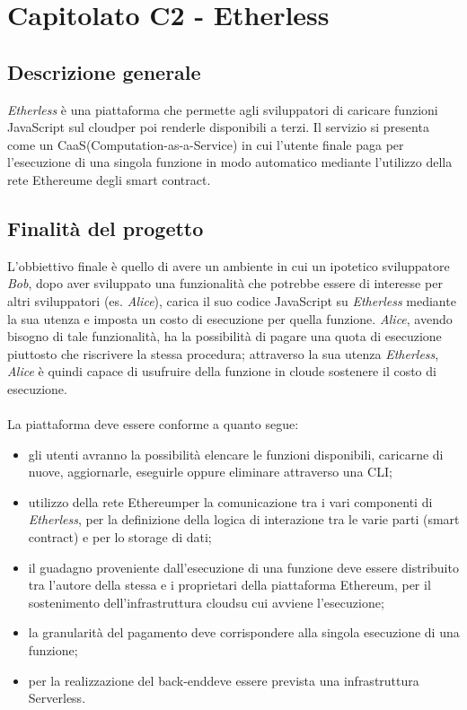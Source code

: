 \section{Capitolato C2 - Etherless}

\subsection{Descrizione generale}
\textit{Etherless} è una piattaforma che permette agli sviluppatori di caricare funzioni JavaScript sul cloud\glo per poi renderle disponibili a terzi. Il servizio si presenta come un CaaS\glo (Computation-as-a-Service) in cui l'utente finale paga per l'esecuzione di una singola funzione in modo automatico mediante l'utilizzo della rete Ethereum\glo e degli smart contract\glos. 
\subsection{Finalità del progetto}
L'obbiettivo finale è quello di avere un ambiente in cui un ipotetico sviluppatore \textit{Bob}, dopo aver sviluppato una funzionalità che potrebbe essere di interesse per altri sviluppatori (es. \textit{Alice}), carica il suo codice JavaScript su \textit{Etherless} mediante la sua utenza e imposta un costo di esecuzione per quella funzione. \textit{Alice}, avendo bisogno di tale funzionalità, ha la possibilità di pagare una quota di esecuzione piuttosto che riscrivere la stessa procedura; attraverso la sua utenza \textit{Etherless}, \textit{Alice} è quindi capace di usufruire della funzione in cloud\glo e sostenere il costo di esecuzione.
\\\\
La piattaforma deve essere conforme a quanto segue:
\begin{itemize}
	\item gli utenti avranno la possibilità elencare le funzioni disponibili,  caricarne di nuove, aggiornarle, eseguirle oppure eliminare attraverso una CLI\glos;
	\item utilizzo della rete Ethereum\glo per la comunicazione tra i vari componenti di \textit{Etherless}, per la definizione della logica di interazione tra le varie parti (smart contract\glos) e per lo storage di dati;
	\item il guadagno proveniente dall'esecuzione di una funzione deve essere distribuito tra l'autore della stessa e i proprietari della piattaforma Ethereum\glos, per il sostenimento dell'infrastruttura cloud\glo su cui avviene l'esecuzione;
	\item la granularità del pagamento deve corrispondere alla singola esecuzione di una funzione;
	\item per la realizzazione del back-end\glo deve essere prevista una infrastruttura Serverless\glos.
\end{itemize}


